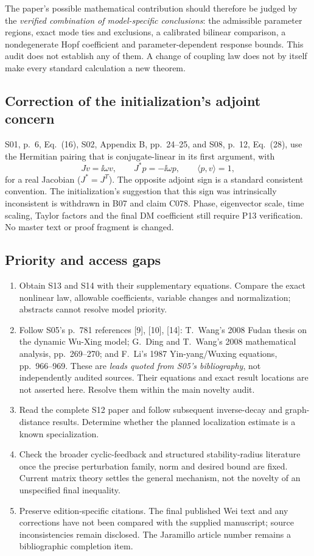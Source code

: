 The paper's possible mathematical contribution should therefore be
judged by the \emph{verified combination of model-specific conclusions}:
the admissible parameter regions, exact mode ties and exclusions,
a calibrated bilinear comparison, a nondegenerate Hopf coefficient
and parameter-dependent response bounds. This audit does not establish
any of them. A change of coupling law does not by itself make every
standard calculation a new theorem.

\subsection{Correction of the initialization's adjoint concern}
S01, p.~6, Eq.~(16), S02, Appendix B, pp.~24--25, and S08,
p.~12, Eq.~(28), use the Hermitian pairing that is conjugate-linear
in its first argument, with
\[
 Jv=\ii\omega v,\qquad J^*p=-\ii\omega p,
 \qquad \langle p,v\rangle=1,
\]
for a real Jacobian ($J^*=J^T$). The opposite adjoint sign is a
standard consistent convention. The initialization's suggestion
that this sign was intrinsically inconsistent is withdrawn in
B07 and claim C078. Phase, eigenvector scale, time scaling,
Taylor factors and the final DM coefficient still require P13
verification. No master text or proof fragment is changed.

\subsection{Priority and access gaps}
\begin{enumerate}
\item Obtain S13 and S14 with their supplementary equations. Compare
the exact nonlinear law, allowable coefficients, variable changes
and normalization; abstracts cannot resolve model priority.
\item Follow S05's p.~781 references [9], [10], [14]: T.~Wang's
2008 Fudan thesis on the dynamic Wu-Xing model; G.~Ding and
T.~Wang's 2008 mathematical analysis, pp.~269--270; and F.~Li's
1987 Yin-yang/Wuxing equations, pp.~966--969. These are
\emph{leads quoted from S05's bibliography}, not independently
audited sources. Their equations and exact result locations are
not asserted here. Resolve them within the main novelty audit.
\item Read the complete S12 paper and follow subsequent inverse-decay
and graph-distance results. Determine whether the planned
localization estimate is a known specialization.
\item Check the broader cyclic-feedback and structured stability-radius
literature once the precise perturbation family, norm and desired
bound are fixed. Current matrix theory settles the general
mechanism, not the novelty of an unspecified final inequality.
\item Preserve edition-specific citations. The final published Wei
text and any corrections have not been compared with the supplied
manuscript; source inconsistencies remain disclosed. The Jaramillo
article number remains a bibliographic completion item.
\end{enumerate}

